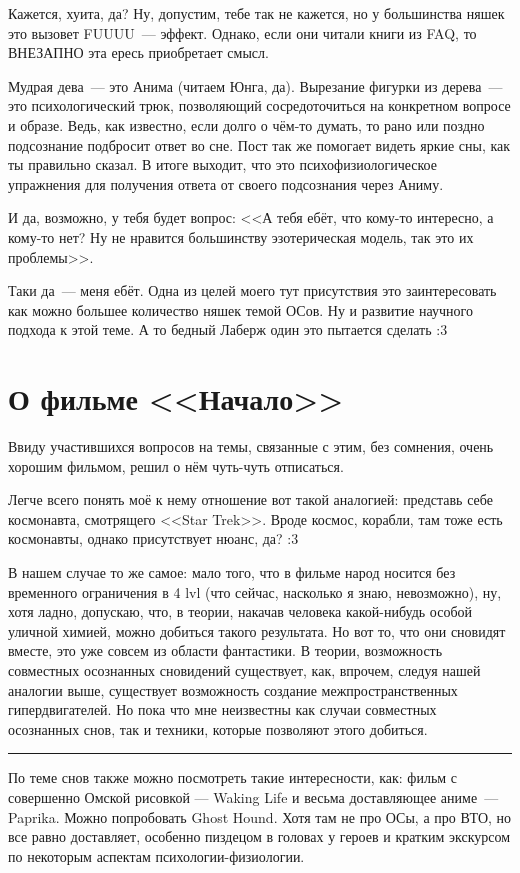 \documentclass[a5paper,12pt,twoside]{memoir}
\begin{document}
Кажется, хуита, да? Ну, допустим, тебе так не кажется, но у большинства няшек это вызовет FUUUU~--- эффект. Однако, если они читали книги из FAQ, то ВНЕЗАПНО эта ересь приобретает смысл. 

Мудрая дева~--- это Анима (читаем Юнга, да). Вырезание фигурки из дерева~--- это психологический трюк, позволяющий сосредоточиться на конкретном вопросе и образе. Ведь, как известно, если долго о чём-то думать, то рано или поздно подсознание подбросит ответ во сне. Пост так же помогает видеть яркие сны, как ты правильно сказал. В итоге выходит, что это психофизиологическое упражнения для получения ответа от своего подсознания через Аниму. 

И да, возможно, у тебя будет вопрос: <<А тебя ебёт, что кому-то интересно, а кому-то нет? Ну не нравится большинству эзотерическая модель, так это их проблемы>>.
 
Таки да~--- меня ебёт. Одна из целей моего тут присутствия это заинтересовать как можно большее количество няшек темой ОСов. Ну и развитие научного подхода к этой теме. А то бедный Лаберж один это пытается сделать :3 




\section{О фильме <<Начало>>}
Ввиду участившихся вопросов на темы, связанные с этим, без сомнения, очень хорошим фильмом, решил о нём чуть-чуть отписаться. 

Легче всего понять моё к нему отношение вот такой аналогией: представь себе космонавта, смотрящего <<Star Trek>>. Вроде космос, корабли, там тоже есть космонавты, однако присутствует нюанс, да? :3 

В нашем случае то же самое: мало того, что в фильме народ носится без временного ограничения в 4 lvl (что сейчас, насколько я знаю, невозможно), ну, хотя ладно, допускаю, что, в теории, накачав человека какой-нибудь особой уличной химией, можно добиться такого результата. Но вот то, что они сновидят вместе, это уже совсем из области фантастики. В теории, возможность совместных осознанных сновидений существует, как, впрочем, следуя нашей аналогии выше, существует возможность создание межпространственных гипердвигателей. Но пока что мне неизвестны как случаи совместных осознанных снов, так и техники, которые позволяют этого добиться. 

\smallskip
\fancybreak{* * *}

По теме снов также можно посмотреть такие интересности, как: фильм с совершенно Омской рисовкой — Waking Life и весьма доставляющее аниме~--- Paprika. Можно попробовать Ghost Hound. Хотя там не про ОСы, а про ВТО, но все равно доставляет, особенно пиздецом в головах у героев и кратким экскурсом по некоторым аспектам психологии-физиологии.
\end{document}
